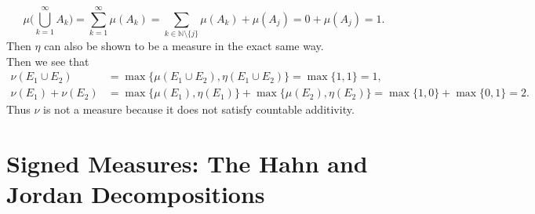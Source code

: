 \begin{enumerate}
	\[
		\mu\biggl(\bigcup_{k=1}^\infty A_k\biggr)=\sum_{k=1}^\infty\mu(A_k)=\sum_{k\in\mathbb{N}\setminus\{j\}}\mu(A_k)+\mu(A_j)=0+\mu(A_j)=1.
	\]
	Then $\eta$ can also be shown to be a measure in the exact same way.
	\\Then we see that
	\begin{align*}
		\nu(E_1\cup E_2)&=\max\{\mu(E_1\cup E_2),\eta(E_1\cup E_2)\}=\max\{1,1\}=1,\\
		\nu(E_1)+\nu(E_2)&=\max\{\mu(E_1),\eta(E_1)\}+\max\{\mu(E_2),\eta(E_2)\}=\max\{1,0\}+\max\{0,1\}=2.
	\end{align*}
	Thus $\nu$ is not a measure because it does not satisfy countable additivity.
\end{enumerate}

\section{Signed Measures: The Hahn and Jordan Decompositions}
